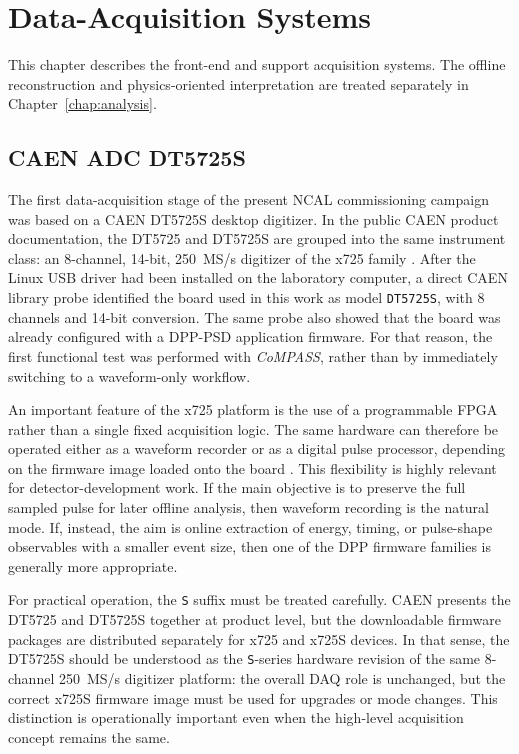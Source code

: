 \chapter{Data-Acquisition Systems}

This chapter describes the front-end and support acquisition systems. The offline reconstruction and physics-oriented interpretation are treated separately in Chapter~\ref{chap:analysis}.

\section{CAEN ADC DT5725S}

The first data-acquisition stage of the present NCAL commissioning campaign was based on a CAEN DT5725S desktop digitizer. In the public CAEN product documentation, the DT5725 and DT5725S are grouped into the same instrument class: an 8-channel, 14-bit, \SI{250}{MS/s} digitizer of the x725 family \citep{CAENDT5725Page}. After the Linux USB driver had been installed on the laboratory computer, a direct CAEN library probe identified the board used in this work as model \texttt{DT5725S}, with 8 channels and 14-bit conversion. The same probe also showed that the board was already configured with a DPP-PSD application firmware. For that reason, the first functional test was performed with \textit{CoMPASS}, rather than by immediately switching to a waveform-only workflow.

An important feature of the x725 platform is the use of a programmable FPGA rather than a single fixed acquisition logic. The same hardware can therefore be operated either as a waveform recorder or as a digital pulse processor, depending on the firmware image loaded onto the board \citep{CAENDT5725Page,CAENDWavePage}. This flexibility is highly relevant for detector-development work. If the main objective is to preserve the full sampled pulse for later offline analysis, then waveform recording is the natural mode. If, instead, the aim is online extraction of energy, timing, or pulse-shape observables with a smaller event size, then one of the DPP firmware families is generally more appropriate.

For practical operation, the \texttt{S} suffix must be treated carefully. CAEN presents the DT5725 and DT5725S together at product level, but the downloadable firmware packages are distributed separately for x725 and x725S devices. In that sense, the DT5725S should be understood as the \texttt{S}-series hardware revision of the same 8-channel \SI{250}{MS/s} digitizer platform: the overall DAQ role is unchanged, but the correct x725S firmware image must be used for upgrades or mode changes. This distinction is operationally important even when the high-level acquisition concept remains the same.

